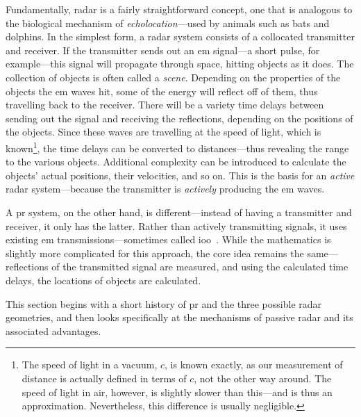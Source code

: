 \documentclass[class=report,11pt,crop=false]{standalone}
\begin{document}
Fundamentally, radar is a fairly straightforward concept, one that is analogous to the biological mechanism of \emph{echolocation}---used by animals such as bats and dolphins. In the simplest form, a radar system consists of a collocated transmitter and receiver. If the transmitter sends out an \gls{em} signal---a short pulse, for example---this signal will propagate through space, hitting objects as it does. The collection of objects is often called a \emph{scene}. Depending on the properties of the objects the \gls{em} waves hit, some of the energy will reflect off of them, thus travelling back to the receiver. There will be a variety time delays between sending out the signal and receiving the reflections, depending on the positions of the objects. Since these waves are travelling at the speed of light, which is known\footnote{The speed of light in a vacuum, \(c\), is known exactly, as our measurement of distance is actually defined in terms of \(c\), not the other way around. The speed of light in air, however, is slightly slower than this---and is thus an approximation. Nevertheless, this difference is usually negligible.}, the time delays can be converted to distances---thus revealing the range to the various objects. Additional complexity can be introduced to calculate the objects' actual positions, their velocities, and so on. This is the basis for an \emph{active} radar system---because the transmitter is \emph{actively} producing the \gls{em} waves.

A \gls{pr} system, on the other hand, is different---instead of having a transmitter and receiver, it only has the latter. Rather than actively transmitting signals, it uses existing \gls{em} transmissions---sometimes called \gls{ioo}~\cite{Griffiths1992}. While the mathematics is slightly more complicated for this approach, the core idea remains the same---reflections of the transmitted signal are measured, and using the calculated time delays, the locations of objects are calculated.

This section begins with a short history of \gls{pr} and the three possible radar geometries, and then looks specifically at the mechanisms of passive radar and its associated advantages.
\end{document}
